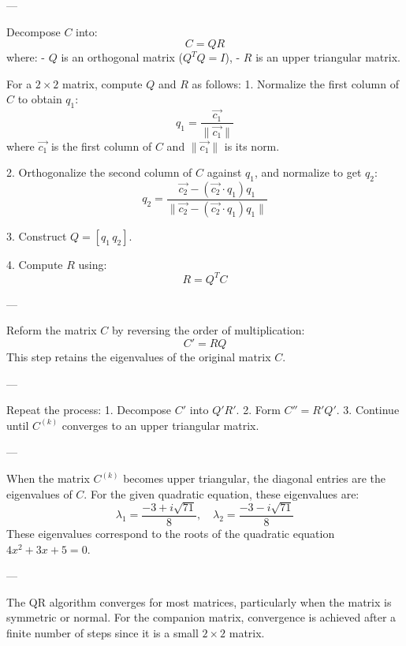 \documentclass[journal]{IEEEtran}
\begin{document}
---


Decompose \( C \) into:
\[
C = QR
\]
where:
- \( Q \) is an orthogonal matrix (\( Q^T Q = I \)),
- \( R \) is an upper triangular matrix.

For a \( 2 \times 2 \) matrix, compute \( Q \) and \( R \) as follows:
1. Normalize the first column of \( C \) to obtain \( q_1 \):
\[
q_1 = \frac{\vec{c_1}}{\|\vec{c_1}\|}
\]
where \( \vec{c_1} \) is the first column of \( C \) and \( \|\vec{c_1}\| \) is its norm.

2. Orthogonalize the second column of \( C \) against \( q_1 \), and normalize to get \( q_2 \):
\[
q_2 = \frac{\vec{c_2} - (\vec{c_2} \cdot q_1)q_1}{\|\vec{c_2} - (\vec{c_2} \cdot q_1)q_1\|}
\]

3. Construct \( Q = [q_1 \, q_2] \).

4. Compute \( R \) using:
\[
R = Q^T C
\]

---


Reform the matrix \( C \) by reversing the order of multiplication:
\[
C' = RQ
\]
This step retains the eigenvalues of the original matrix \( C \).

---


Repeat the process:
1. Decompose \( C' \) into \( Q'R' \).
2. Form \( C'' = R'Q' \).
3. Continue until \( C^{(k)} \) converges to an upper triangular matrix.

---


When the matrix \( C^{(k)} \) becomes upper triangular, the diagonal entries are the eigenvalues of \( C \). For the given quadratic equation, these eigenvalues are:
\[
\boxed{\lambda_1 = \frac{-3 + i\sqrt{71}}{8}, \quad \lambda_2 = \frac{-3 - i\sqrt{71}}{8}}
\]
These eigenvalues correspond to the roots of the quadratic equation \( 4x^2 + 3x + 5 = 0 \).

---


The QR algorithm converges for most matrices, particularly when the matrix is symmetric or normal. For the companion matrix, convergence is achieved after a finite number of steps since it is a small \( 2 \times 2 \) matrix.
\end{document}
